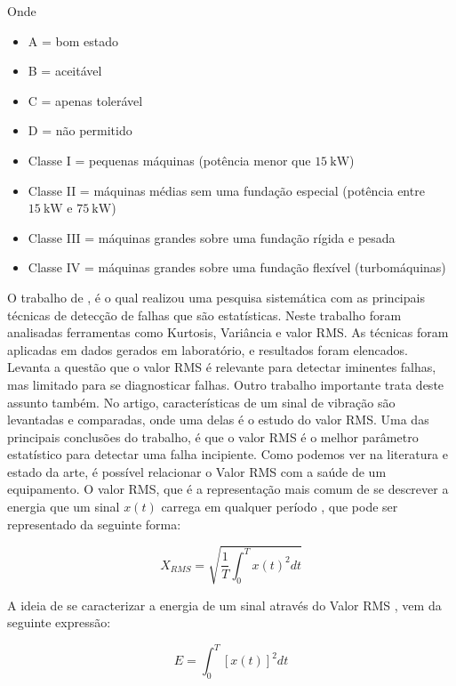 \documentclass[a4paper]{ifacconf}
\begin{document}
Onde

\begin{itemize}
    \item A = bom estado
    \item B = aceitável
    \item C = apenas tolerável
    \item D = não permitido
    \item Classe I = pequenas máquinas (potência menor que $\SI{15}{\kilo\watt}$)
    \item Classe II = máquinas médias sem uma fundação especial (potência entre $\SI{15}{\kilo\watt}$ e $\SI{75}{\kilo\watt}$)
    \item Classe III = máquinas grandes sobre uma fundação rígida e pesada
    \item Classe IV = máquinas grandes sobre uma fundação flexível (turbomáquinas) 
\end{itemize}

O trabalho de \cite*{Caesarendra2017}, é o qual realizou uma pesquisa sistemática com as principais técnicas de detecção de 
falhas que são estatísticas. Neste trabalho foram analisadas ferramentas como Kurtosis, Variância e valor RMS. As técnicas foram aplicadas em 
dados gerados em laboratório, e resultados foram elencados. Levanta a questão que o valor RMS é relevante para detectar iminentes falhas, mas
limitado para se diagnosticar falhas. Outro trabalho importante \cite*{Hemmati2016a} trata deste assunto também. No artigo, características de um sinal de vibração são levantadas e comparadas,
onde uma delas é o estudo do valor RMS. Uma das principais conclusões do trabalho, é que o 
valor RMS é o melhor parâmetro estatístico para detectar uma falha incipiente. Como podemos ver na literatura e estado da arte, é possível 
relacionar o Valor RMS com a saúde de um equipamento. O valor RMS, que é a representação mais comum de se descrever a energia que um sinal  
$x(t)$ carrega em qualquer período \citep{Cryer2010}, que pode ser representado da seguinte forma:

\begin{equation}\label{eq:rms_int}
    X_{RMS} = \sqrt{\frac{1}{T}\int_{0}^{T}{x(t)^2dt}}
\end{equation}

A ideia de se caracterizar a energia de um sinal através do Valor RMS \citep{Cryer2010}, vem da seguinte expressão:

\begin{equation}\label{eq:energia}
    E = \int_{0}^{T}{[x(t)]^2dt}
\end{equation}
\end{document}
